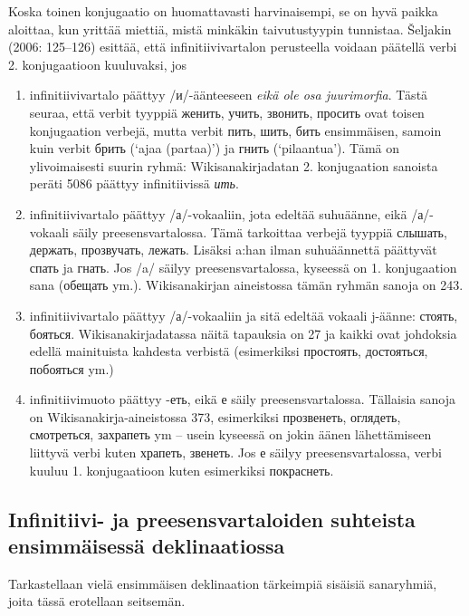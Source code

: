 \documentclass[]{scrartcl}
\providecommand{\tightlist}{%
  \setlength{\itemsep}{0pt}\setlength{\parskip}{0pt}}
\begin{document}
Koska toinen konjugaatio on huomattavasti harvinaisempi, se on hyvä
paikka aloittaa, kun yrittää miettiä, mistä minkäkin taivutustyypin
tunnistaa. Šeljakin (2006: 125--126) esittää, että infinitiivivartalon
perusteella voidaan päätellä verbi 2. konjugaatioon kuuluvaksi, jos

\begin{enumerate}
\def\labelenumi{\arabic{enumi}.}
\tightlist
\item
  infinitiivivartalo päättyy /и/-äänteeseen \emph{eikä ole osa
  juurimorfia}. Tästä seuraa, että verbit tyyppiä женить, учить,
  звонить, просить ovat toisen konjugaation verbejä, mutta verbit пить,
  шить, бить ensimmäisen, samoin kuin verbit брить (`ajaa (partaa)') ja
  гнить (`pilaantua'). Tämä on ylivoimaisesti suurin ryhmä:
  Wikisanakirjadatan 2. konjugaation sanoista peräti 5086 päättyy
  infinitiivissä \emph{ить}.
\item
  infinitiivivartalo päättyy /а/-vokaaliin, jota edeltää suhuäänne, eikä
  /а/-vokaali säily preesensvartalossa. Tämä tarkoittaa verbejä tyyppiä
  слышать, держать, прозвучать, лежать. Lisäksi a:han ilman suhuäännettä
  päättyvät спать ja гнать. Jos /a/ säilyy preesensvartalossa, kyseessä
  on 1. konjugaation sana (обещать ym.). Wikisanakirjan aineistossa
  tämän ryhmän sanoja on 243.
\item
  infinitiivivartalo päättyy /а/-vokaaliin ja sitä edeltää vokaali
  j-äänne: стоять, бояться. Wikisanakirjadatassa näitä tapauksia on 27
  ja kaikki ovat johdoksia edellä mainituista kahdesta verbistä
  (esimerkiksi простоять, достояться, побояться ym.)
\item
  infinitiivimuoto päättyy -еть, eikä е säily preesensvartalossa.
  Tällaisia sanoja on Wikisanakirja-aineistossa 373, esimerkiksi
  прозвенеть, оглядеть, смотреться, захрапеть ym -- usein kyseessä on
  jokin äänen lähettämiseen liittyvä verbi kuten храпеть, звенеть. Jos е
  säilyy preesensvartalossa, verbi kuuluu 1. konjugaatioon kuten
  esimerkiksi покраснеть.
\end{enumerate}

\subsection{Infinitiivi- ja preesensvartaloiden suhteista ensimmäisessä
deklinaatiossa}\label{infinitiivi--ja-preesensvartaloiden-suhteista-ensimmuxe4isessuxe4-deklinaatiossa}

Tarkastellaan vielä ensimmäisen deklinaation tärkeimpiä sisäisiä
sanaryhmiä, joita tässä erotellaan seitsemän.
\end{document}
